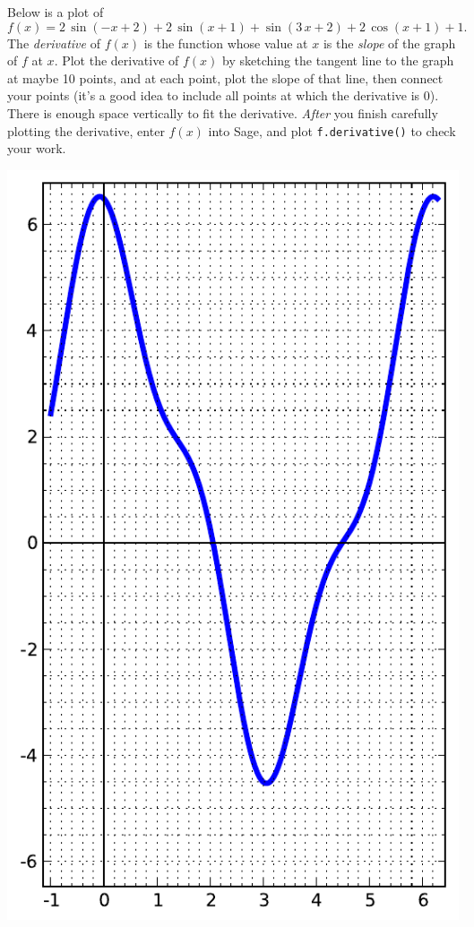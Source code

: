 Below is a plot of $$f(x)=2 \, \sin\left(-x + 2\right) + 2 \, \sin\left(x + 1\right) + \sin\left(3 \, x + 2\right) + 2 \, \cos\left(x + 1\right) + 1.$$  The {\em \color{red}derivative} of $f(x)$ is the function whose value at $x$ is the {\em slope} of the graph of $f$ at $x$.  Plot the derivative of $f(x)$ by sketching the tangent line to the graph at maybe 10 points, and at each point, plot the slope of that line, then connect your points (it's a good idea to include all points at which the derivative is 0).  There is enough space vertically to fit the derivative.  {\em After} you finish carefully plotting the derivative, enter $f(x)$ into Sage, and plot {\color{blue}\verb|f.derivative()|} to check your work.
\begin{center}\includegraphics{functions/84.pdf}\end{center}\newpage

